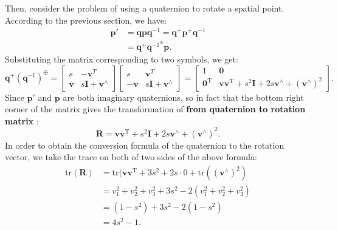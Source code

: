 Then, consider the problem of using a quaternion to rotate a spatial point. According to the previous section, we have:
\begin{equation}
	\begin{split}
		\mathbf{p}' &= \mathbf{q} \mathbf{p} \mathbf{q}^{-1} = \mathbf{q}^+ \mathbf{p}^+ \mathbf{q}^{ -1} \\
		&= \mathbf{q}^+ \mathbf{q}^{{-1}^{\oplus}} \mathbf{p}.
	\end{split}
\end{equation}
Substituting the matrix corresponding to two symbols, we get:
\begin{equation}\label{eq:quaternion-to-rotation-matrix-derive}
	{\mathbf{q}^ + }{\left( {{\mathbf{q}^{ - 1}}} \right)^ \oplus } = \left[ \begin{array}{*{20}{c }}
		s&-\mathbf{v}^T\\
		\mathbf{v}&s\mathbf{I}+\mathbf{v}^\wedge
	\end{array} \right]\left[\begin{array}{*{20}{c}}
		s&{\mathbf{v} ^T}\\
		{ - \mathbf{v} }&{s\mathbf{I} + \mathbf{v} ^ \wedge }
	\end{array} \right] = \left[ \begin{array}{*{20}{c}}
		1&\mathbf{0} \\
		\mathbf{0}^\mathrm{T}&\mathbf{v}\mathbf{v}^\mathrm{T} + {s^2} \mathbf{I} + 2s\mathbf{v} ^ \wedge + {(\mathbf{v} ^ \wedge)}^2
	\end{array} \right].
\end{equation}
Since $\mathbf{p}'$ and $\mathbf{p}$ are both imaginary quaternions, so in fact that the bottom right corner of the matrix gives the transformation of \textbf{from quaternion to rotation matrix} :
\begin{equation}
	\mathbf{R} = \mathbf{v} \mathbf{v}^\mathrm{T} + {s^2} \mathbf{I} + 2s\mathbf{v} ^ \wedge + {(\mathbf{v } ^ \wedge)}^2.
\end{equation}
In order to obtain the conversion formula of the quaternion to the rotation vector, we take the trace on both of two sides of the above formula:
\begin{equation}
	\begin{aligned}
		\mathrm{tr}(\mathbf{R}) &= \mathrm{tr}(\mathbf{v}\mathbf{v}^\mathrm{T} + 3s^2 + 2s \cdot 0 + \mathrm{tr }((\mathbf{v}^\wedge)^2) \\
		&= v_1^2+v_2^2+v_3^2 + 3s^2 - 2(v_1^2+v_2^2+v_3^2) \\
		&= (1-s^2) + 3s^2 -2(1-s^2)\\
		&= 4s^2 -1.
	\end{aligned}
\end{equation}
